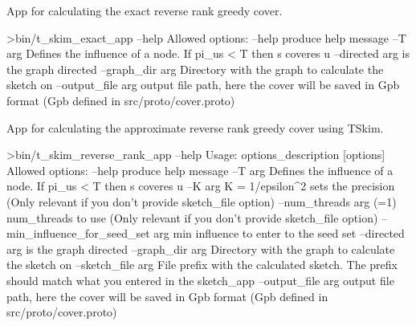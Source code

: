 App for calculating the exact reverse rank greedy cover.

\begin{DoxyVerb}>bin/t_skim_exact_app --help
    Allowed options:
  --help                produce help message
  --T arg               Defines the influence of a node. If pi_{us} < T then s 
                        coveres u
  --directed arg        is the graph directed
  --graph_dir arg       Directory with the graph to calculate the sketch on
  --output_file arg     output file path, here the cover will be saved in Gpb 
                        format (Gpb defined in src/proto/cover.proto)
\end{DoxyVerb}


App for calculating the approximate reverse rank greedy cover using T\+Skim. \begin{DoxyVerb}>bin/t_skim_reverse_rank_app --help
    Usage: options_description [options]
    Allowed options:
  --help                           produce help message
  --T arg                          Defines the influence of a node. If pi_{us} 
                                   < T then s coveres u
  --K arg                          K = 1/epsilon^2 sets the precision (Only relevant if you don't provide sketch_file option)
  --num_threads arg (=1)           num_threads to use (Only relevant if you don't provide sketch_file option)
  --min_influence_for_seed_set arg min influence to enter to the seed set
  --directed arg                   is the graph directed
  --graph_dir arg                  Directory with the graph to calculate the 
                                   sketch on
  --sketch_file arg                File prefix with the calculated sketch. The prefix should match what you entered in the sketch_app
  --output_file arg                output file path, here the cover will be 
                                   saved in Gpb format (Gpb defined in 
                                   src/proto/cover.proto)\end{DoxyVerb}
 
